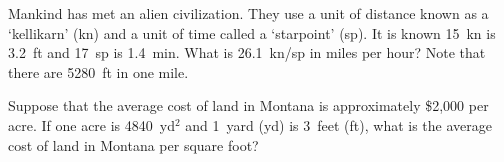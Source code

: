 \documentclass[12pt,letterpaper]{exam}
\begin{document}
\begin{questions}
\newpage
\question[10] Mankind has met an alien civilization. They use a unit of distance known as a `kellikarn' (kn) and a unit of time called a `starpoint' (sp). It is known 15~kn is 3.2~ft and 17~sp is 1.4~min. What is 26.1~kn/sp in miles per hour? Note that there are 5280~ft in one mile. 



\newpage
\question[10] Suppose that the average cost of land in Montana is approximately \$2,000 per acre. If one acre is 4840~yd$^2$ and 1~yard (yd) is 3~feet (ft), what is the average cost of land in Montana per square foot?


\end{questions}
\end{document}
